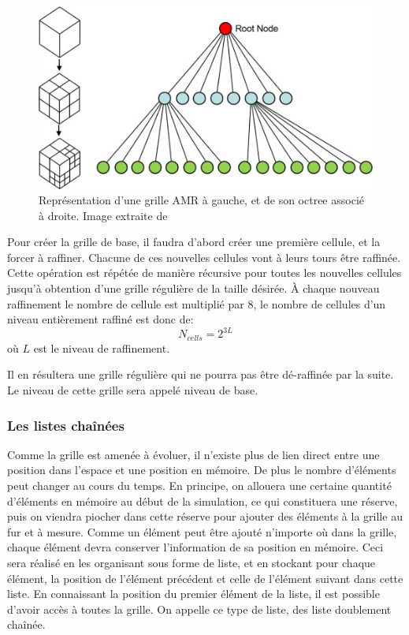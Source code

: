 \begin{figure}
        \includegraphics[width=.95\linewidth]{img/02/octree.jpg} 
        \caption[Grille AMR et son octree]{Représentation d'une grille AMR à gauche, et de son octree associé à droite. 
        Image extraite de \cite{SU201659}
     	\label{fig:octree}
}
\end{figure}

Pour créer la grille de base, il faudra d'abord créer une première cellule, et la forcer à raffiner.
Chacune de ces nouvelles cellules vont à leurs tours être raffinée.
Cette opération est répétée de manière récursive pour toutes les nouvelles cellules jusqu'à obtention d'une grille régulière de la taille désirée.
À chaque nouveau raffinement le nombre de cellule est multiplié par 8, le nombre de cellules d'un niveau entièrement raffiné est donc de:
\begin{equation}
N_{cells} = 2^{3L}
\end{equation}
où $L$ est le niveau de raffinement.

Il en résultera une grille régulière qui ne pourra pas être dé-raffinée par la suite.
Le niveau de cette grille sera appelé niveau de base.

\subsubsection{Les listes chaînées}
\label{sec:listechainee}
Comme la grille est amenée à évoluer, il n'existe plus de lien direct entre une position dans l'espace et une position en mémoire.
De plus le nombre d'éléments peut changer au cours du temps.
En principe, on allouera une certaine quantité d'éléments en mémoire au début de la simulation, ce qui constituera une réserve, puis on viendra piocher dans cette réserve pour ajouter des éléments à la grille au fur et à mesure.
Comme un élément peut être ajouté n'importe où dans la grille, chaque élément devra conserver l'information de sa position en mémoire.
Ceci sera réalisé en les organisant sous forme de liste, et en stockant pour chaque élément, la position de l'élément précédent et celle de l'élément suivant dans cette liste.
En connaissant la position du premier élément de la liste, il est possible d'avoir accès à toutes la grille.
On appelle ce type de liste, des liste doublement chaînée.


